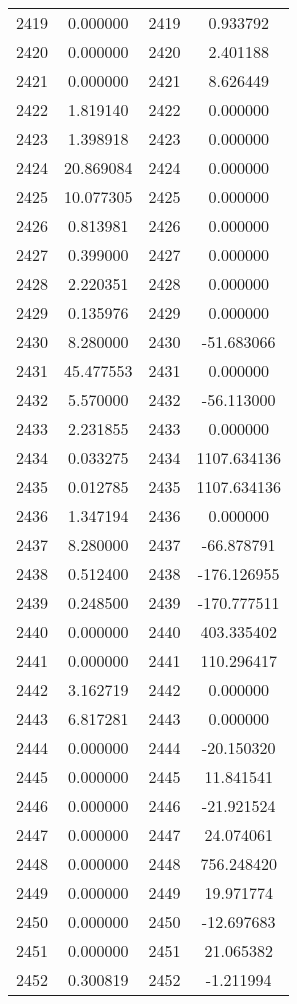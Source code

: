 \documentclass[12pt]{article}
\begin{document}
\begin{longtable}{@{}cccc@{}}
2419 & 0.000000 & 2419 & 0.933792 \\
2420 & 0.000000 & 2420 & 2.401188 \\
2421 & 0.000000 & 2421 & 8.626449 \\
2422 & 1.819140 & 2422 & 0.000000 \\
2423 & 1.398918 & 2423 & 0.000000 \\
2424 & 20.869084 & 2424 & 0.000000 \\
2425 & 10.077305 & 2425 & 0.000000 \\
2426 & 0.813981 & 2426 & 0.000000 \\
2427 & 0.399000 & 2427 & 0.000000 \\
2428 & 2.220351 & 2428 & 0.000000 \\
2429 & 0.135976 & 2429 & 0.000000 \\
2430 & 8.280000 & 2430 & -51.683066 \\
2431 & 45.477553 & 2431 & 0.000000 \\
2432 & 5.570000 & 2432 & -56.113000 \\
2433 & 2.231855 & 2433 & 0.000000 \\
2434 & 0.033275 & 2434 & 1107.634136 \\
2435 & 0.012785 & 2435 & 1107.634136 \\
2436 & 1.347194 & 2436 & 0.000000 \\
2437 & 8.280000 & 2437 & -66.878791 \\
2438 & 0.512400 & 2438 & -176.126955 \\
2439 & 0.248500 & 2439 & -170.777511 \\
2440 & 0.000000 & 2440 & 403.335402 \\
2441 & 0.000000 & 2441 & 110.296417 \\
2442 & 3.162719 & 2442 & 0.000000 \\
2443 & 6.817281 & 2443 & 0.000000 \\
2444 & 0.000000 & 2444 & -20.150320 \\
2445 & 0.000000 & 2445 & 11.841541 \\
2446 & 0.000000 & 2446 & -21.921524 \\
2447 & 0.000000 & 2447 & 24.074061 \\
2448 & 0.000000 & 2448 & 756.248420 \\
2449 & 0.000000 & 2449 & 19.971774 \\
2450 & 0.000000 & 2450 & -12.697683 \\
2451 & 0.000000 & 2451 & 21.065382 \\
2452 & 0.300819 & 2452 & -1.211994 \\

\end{longtable}
\end{document}
